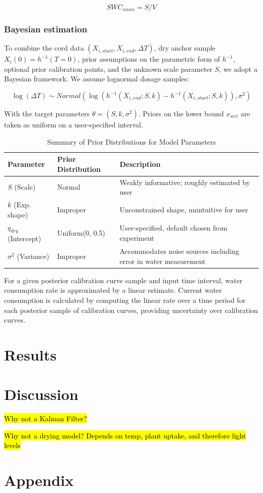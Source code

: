 \documentclass[11pt]{article}
\begin{document}
\begin{equation}
SWC_{xmin} = S / V
\end{equation}

\subsubsection{Bayesian estimation}

To combine the cord data $(X_{i, start}, X_{i, end}, \Delta T)$, dry anchor sample $X_i(0) = h^{-1}(T=0)$, prior assumptions on the parametric form of $h^{-1}$, optional prior calibration points, and the unknown scale parameter $S$, we adopt a Bayesian framework. We assume lognormal dosage samples:

\begin{equation}
\log(\Delta T) \sim Normal(\log (h^{-1}(X_{i, end}; S, k) - h^{-1}(X_{i, start}; S, k)), \sigma^2)
\end{equation}

With the target parameters $\theta = (S, k, \sigma^2)$. Priors on the lower bound $x_{wet}$ are taken as uniform on a user-specified interval.

\begin{table}[ht]
    \centering
    \small %
    \caption{Summary of Prior Distributions for Model Parameters}
    \label{tab:priors}
    \begin{tabularx}{\textwidth}{llX} 
        \toprule
        \textbf{Parameter} & \textbf{Prior Distribution} & \textbf{Description} \\
        \midrule
        $S$ (Scale) & Normal & Weakly informative; roughly estimated by user \\
        $k$ (Exp. shape) & Improper & Unconstrained shape, unintuitive for user \\
        $q_{dry}$ (Intercept) & Uniform(0, 0.5) & User-specified, default chosen from experiment \\
        $\sigma^2$ (Variance) & Improper & Accommodates noise sources including error in water measurement \\
        \bottomrule
    \end{tabularx}
\end{table}

For a given posterior calibration curve sample and input time interval, water consumption rate is approximated by a linear estimate. Current water consumption is calculated by computing the linear rate over a time period for each posterior sample of calibration curves, providing uncertainty over calibration curves.\\

\section{Results}


\section{Discussion}

\hl{Why not a Kalman Filter?}

\hl{Why not a drying model? Depends on temp, plant uptake, and therefore light levels}

\section{Appendix}



\end{document}
